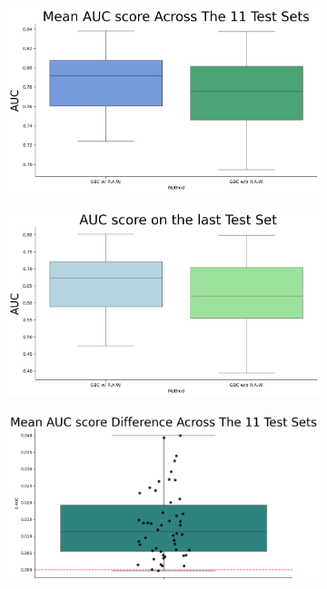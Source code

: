 \begin{figure}[H]
    \centering
    \begin{subfigure}{0.45\textwidth}
        \centering
        \includegraphics[width=\linewidth]{assets/1_075.png}
       
    \end{subfigure}
    \begin{subfigure}{0.45\textwidth}
        \centering
        \includegraphics[width=\linewidth]{assets/2_075.png}
       
    \end{subfigure}
    \begin{subfigure}{0.45\textwidth}
        \centering
        \includegraphics[width=\linewidth]{assets/3_075.png}
        

\end{subfigure}
\end{figure}
